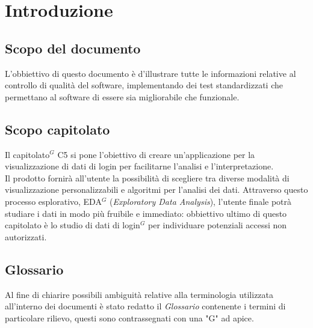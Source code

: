 \section{Introduzione}

\subsection{Scopo del documento}

L'obbiettivo di questo documento è d'illustrare tutte le informazioni relative al controllo di qualità del software, implementando dei test standardizzati che permettano al software di essere sia migliorabile che funzionale.

\subsection{Scopo capitolato}
Il capitolato$^{G}$ C5 si pone l'obiettivo di creare un'applicazione per la visualizzazione di dati
di login per facilitarne l'analisi e l'interpretazione.\\
Il prodotto fornirà all'utente la possibilità di scegliere tra diverse modalità di visualizzazione personalizzabili 
e algoritmi per l'analisi dei dati. Attraverso questo processo esplorativo, EDA$^{G}$ (\textit{Exploratory Data Analysis}), 
l'utente finale potrà studiare i dati in modo più fruibile e immediato: obbiettivo ultimo di questo capitolato 
è lo studio di dati di login$^{G}$ per individuare potenziali accessi non autorizzati.


\subsection{Glossario}
Al fine di chiarire possibili ambiguità relative alla terminologia utilizzata all'interno dei
documenti è stato redatto il \textit{Glossario} contenente i termini di particolare rilievo, questi
sono contrassegnati con una "G" ad apice.
\newpage